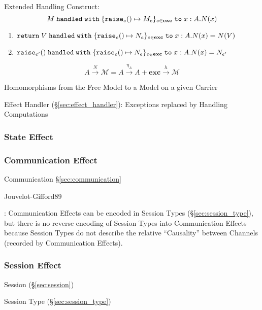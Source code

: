 Extended Handling Construct:
\[
  M \;\mathtt{handled\;with}\;
    \{\mathtt{raise}_e() \mapsto M_e \}_{e\in\mathbf{exc}}
    \;\mathtt{to}\; x : A.N(x)
\]

\begin{enumerate}
  \item $\mathtt{return}\; V \;\mathtt{handled\;with}\;
    \{\mathtt{raise}_e() \mapsto N_e\}_{e \in \mathbf{exc}}
    \;\mathtt{to}\; x:A.N(x)
    = N(V)$
  \item $\mathtt{raise}_{e'}() \;\mathtt{handled\;with}\;
    \{\mathtt{raise}_e() \mapsto N_e\}_{e \in \mathbf{exc}}
    \;\mathtt{to}\; x:A.N(x)
    = N_{e'}$
\end{enumerate}
\[
  A \xrightarrow{N} \mathcal{M} =
    A \xrightarrow{\eta_A} A + \mathbf{exc} \xrightarrow{h} \mathcal{M}
\]

Homomorphisms from the Free Model to a Model on a given Carrier

Effect Handler (\S\ref{sec:effect_handler}): Exceptions replaced by
Handling Computations



\subsubsection{State Effect}\label{sec:state_effect}

\subsubsection{Communication Effect}\label{sec:communication_effect}

Communication \S\ref{sec:communication}

Jouvelot-Gifford89

\cite{nielson-nielson99}

\cite{orchard-yoshida16}: Communication Effects can be encoded in
Session Types (\S\ref{sec:session_type}), but there is no reverse
encoding of Session Types into Communication Effects because Session
Types do not describe the relative ``Causality'' between Channels
(recorded by Communication Effects).



\subsubsection{Session Effect}\label{sec:session_effect}

Session (\S\ref{sec:session})

Session Type (\S\ref{sec:session_type})

